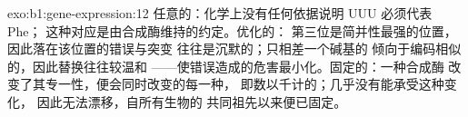 \begin{solution}{exo:b1:gene-expression:12}
任意的：化学上没有任何依据说明 UUU 必须代表 Phe；
这种对应是由合成酶维持的约定。优化的：
第三位是简并性最强的位置，因此落在该位置的错误与突变
往往是沉默的；只相差一个碱基的
倾向于编码相似的，因此替换往往较温和
——使错误造成的危害最小化。固定的：一种合成酶
改变了其专一性，便会同时改变的每一种，
即数以千计的；几乎没有能承受这种变化，
因此无法漂移，自所有生物的
共同祖先以来便已固定。
\end{solution}

